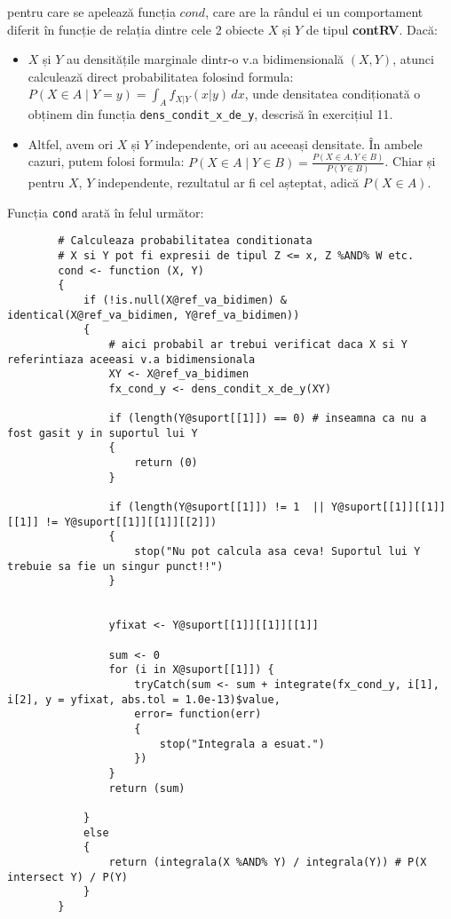 \documentclass[12pt]{article}
\begin{document}
	pentru care se apelează funcția $cond$, care are la rândul ei un comportament diferit în funcție de relația dintre cele 2 obiecte $X$ și $Y$ de tipul \textbf{contRV}. Dacă:
	\begin{itemize}
		\item $X$ și $Y$ au densitățile marginale dintr-o v.a bidimensională $(X, Y)$, atunci calculează direct probabilitatea folosind formula: $\displaystyle P(X \in A \mid Y = y) = \int_{A} f_{X|Y}(x|y) \,dx$, unde densitatea condiționată o obținem din funcția \texttt{dens\_condit\_x\_de\_y}, descrisă în exercițiul 11.
		\item Altfel, avem ori $X$ și $Y$ independente, ori au aceeași densitate. În ambele cazuri, putem folosi formula: $\displaystyle P(X \in A \mid Y \in B) = \frac{P(X \in A, Y \in B)}{P(Y \in B)}$. Chiar și pentru $X$, $Y$ independente, rezultatul ar fi cel așteptat, adică $P(X \in A)$.
	\end{itemize}\pagebreak

	Funcția \texttt{cond} arată în felul următor:
	\begin{lstlisting}
		# Calculeaza probabilitatea conditionata
		# X si Y pot fi expresii de tipul Z <= x, Z %AND% W etc.
		cond <- function (X, Y)
		{
			if (!is.null(X@ref_va_bidimen) & identical(X@ref_va_bidimen, Y@ref_va_bidimen))
			{
				# aici probabil ar trebui verificat daca X si Y referintiaza aceeasi v.a bidimensionala
				XY <- X@ref_va_bidimen
				fx_cond_y <- dens_condit_x_de_y(XY)
				
				if (length(Y@suport[[1]]) == 0) # inseamna ca nu a fost gasit y in suportul lui Y
				{
					return (0)
				}
				
				if (length(Y@suport[[1]]) != 1  || Y@suport[[1]][[1]][[1]] != Y@suport[[1]][[1]][[2]])
				{
					stop("Nu pot calcula asa ceva! Suportul lui Y trebuie sa fie un singur punct!!")
				}
				
				
				yfixat <- Y@suport[[1]][[1]][[1]]
				
				sum <- 0
				for (i in X@suport[[1]]) {
					tryCatch(sum <- sum + integrate(fx_cond_y, i[1], i[2], y = yfixat, abs.tol = 1.0e-13)$value,
					error= function(err)
					{
						stop("Integrala a esuat.")
					})
				}
				return (sum)
				
			}
			else
			{
				return (integrala(X %AND% Y) / integrala(Y)) # P(X intersect Y) / P(Y)
			}
		}
	\end{lstlisting}\pagebreak
\end{document}
